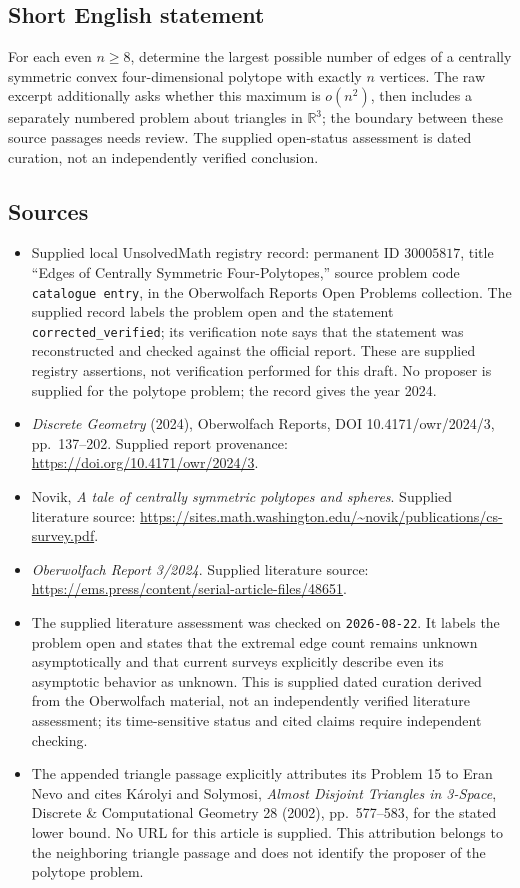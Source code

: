 \documentclass[11pt]{article}
\newcommand{\R}{\mathbb{R}}
\begin{document}
\subsection{Short English statement}
For each even \(n\geq8\), determine the largest possible number of edges of a centrally symmetric convex four-dimensional polytope with exactly \(n\) vertices. The raw excerpt additionally asks whether this maximum is \(o(n^2)\), then includes a separately numbered problem about triangles in \(\R^3\); the boundary between these source passages needs review. The supplied open-status assessment is dated curation, not an independently verified conclusion.
\subsection{Sources}
\begin{itemize}
\item Supplied local UnsolvedMath registry record: permanent ID \(30005817\), title ``Edges of Centrally Symmetric Four-Polytopes,'' source problem code \texttt{catalogue entry}, in the Oberwolfach Reports Open Problems collection. The supplied record labels the problem open and the statement \texttt{corrected\_verified}; its verification note says that the statement was reconstructed and checked against the official report. These are supplied registry assertions, not verification performed for this draft. No proposer is supplied for the polytope problem; the record gives the year 2024.
\item \emph{Discrete Geometry} (2024), Oberwolfach Reports, DOI 10.4171/owr/2024/3, pp.~137--202. Supplied report provenance: \url{https://doi.org/10.4171/owr/2024/3}.
\item Novik, \emph{A tale of centrally symmetric polytopes and spheres}. Supplied literature source: \url{https://sites.math.washington.edu/~novik/publications/cs-survey.pdf}.
\item \emph{Oberwolfach Report 3/2024}. Supplied literature source: \url{https://ems.press/content/serial-article-files/48651}.
\item The supplied literature assessment was checked on \texttt{2026-08-22}. It labels the problem open and states that the extremal edge count remains unknown asymptotically and that current surveys explicitly describe even its asymptotic behavior as unknown. This is supplied dated curation derived from the Oberwolfach material, not an independently verified literature assessment; its time-sensitive status and cited claims require independent checking.
\item The appended triangle passage explicitly attributes its Problem 15 to Eran Nevo and cites K\'arolyi and Solymosi, \emph{Almost Disjoint Triangles in 3-Space}, Discrete \& Computational Geometry 28 (2002), pp.~577--583, for the stated lower bound. No URL for this article is supplied. This attribution belongs to the neighboring triangle passage and does not identify the proposer of the polytope problem.
\end{itemize}
\end{document}
